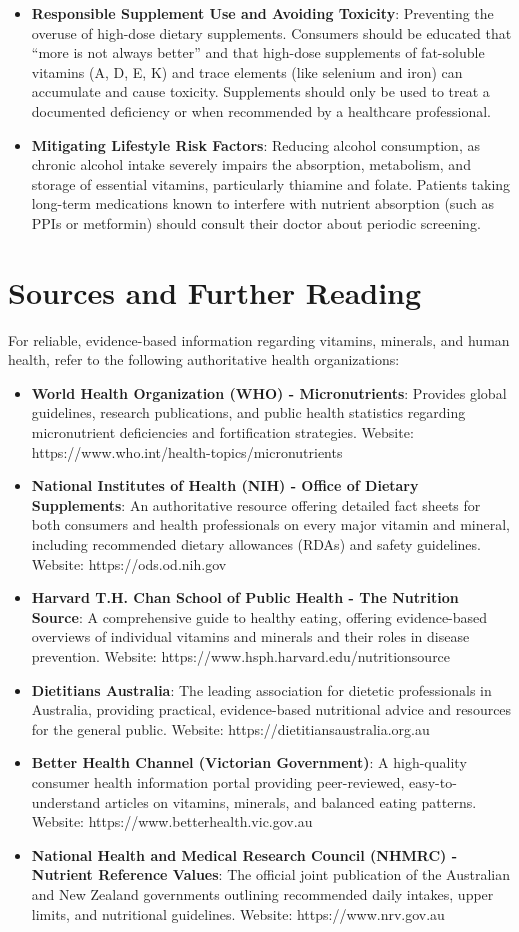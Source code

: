 \begin{itemize}
\item \textbf{Responsible Supplement Use and Avoiding Toxicity}: Preventing the overuse of high-dose dietary supplements. Consumers should be educated that ``more is not always better'' and that high-dose supplements of fat-soluble vitamins (A, D, E, K) and trace elements (like selenium and iron) can accumulate and cause toxicity. Supplements should only be used to treat a documented deficiency or when recommended by a healthcare professional.
\item \textbf{Mitigating Lifestyle Risk Factors}: Reducing alcohol consumption, as chronic alcohol intake severely impairs the absorption, metabolism, and storage of essential vitamins, particularly thiamine and folate. Patients taking long-term medications known to interfere with nutrient absorption (such as PPIs or metformin) should consult their doctor about periodic screening.
\end{itemize}

\section*{Sources and Further Reading}
For reliable, evidence-based information regarding vitamins, minerals, and human health, refer to the following authoritative health organizations:
\begin{itemize}
\item \textbf{World Health Organization (WHO) - Micronutrients}: Provides global guidelines, research publications, and public health statistics regarding micronutrient deficiencies and fortification strategies. Website: https://www.who.int/health-topics/micronutrients
\item \textbf{National Institutes of Health (NIH) - Office of Dietary Supplements}: An authoritative resource offering detailed fact sheets for both consumers and health professionals on every major vitamin and mineral, including recommended dietary allowances (RDAs) and safety guidelines. Website: https://ods.od.nih.gov
\item \textbf{Harvard T.H. Chan School of Public Health - The Nutrition Source}: A comprehensive guide to healthy eating, offering evidence-based overviews of individual vitamins and minerals and their roles in disease prevention. Website: https://www.hsph.harvard.edu/nutritionsource
\item \textbf{Dietitians Australia}: The leading association for dietetic professionals in Australia, providing practical, evidence-based nutritional advice and resources for the general public. Website: https://dietitiansaustralia.org.au
\item \textbf{Better Health Channel (Victorian Government)}: A high-quality consumer health information portal providing peer-reviewed, easy-to-understand articles on vitamins, minerals, and balanced eating patterns. Website: https://www.betterhealth.vic.gov.au
\item \textbf{National Health and Medical Research Council (NHMRC) - Nutrient Reference Values}: The official joint publication of the Australian and New Zealand governments outlining recommended daily intakes, upper limits, and nutritional guidelines. Website: https://www.nrv.gov.au
\end{itemize}